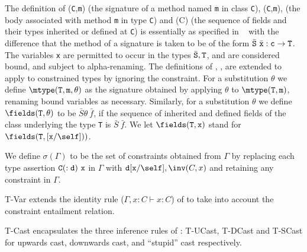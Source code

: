 \def\TConstr{\mbox{\sc T-Constr}}
\def\TInv{\mbox{\sc T-Inv}}
\def\TVar{\mbox{\sc T-Var}}
\def\TField{\mbox{\sc T-Field}}
\def\TInvk{\mbox{\sc T-Invk}}
\def\TNew{\mbox{\sc T-New}}
\def\TCast{\mbox{\sc T-Cast}}
\def\TUCast{\mbox{\sc T-UCast}}
\def\TDCast{\mbox{\sc T-DCast}}
\def\TSCast{\mbox{\sc T-SCast}}

\def\RField{\mbox{\sc R-Field}}
\def\RCField{\mbox{\sc RC-Field}}
\def\RInvk{\mbox{\sc R-Invk}}
\def\RCInvkRecv{\mbox{\sc RC-Invk-Recv}}
\def\RCInvkArg{\mbox{\sc RC-Invk-Arg}}
\def\RCNewArg{\mbox{\sc RC-New-Arg}}
\def\RCast{\mbox{\sc R-Cast}}
\def\RCCast{\mbox{\sc RC-Cast}}

The definition of {\mtype({\tt C},{\tt m})} (the signature of a method
named {\tt m} in class {\tt C}), {\mbody({\tt C},{\tt m})}, (the body
associated with method {\tt m} in type {\tt C}) and \fields(C) (the
sequence of fields and their types inherited or defined at {\tt C}) is
essentially as specified in \FJ{} ~\cite{FJ} with the difference that the
method of a signature is taken to be of the form $\bar{\tt S}\ \bar{\tt
x}: {\tt c} \rightarrow {\tt T}$.  The variables {\tt x} are permitted
to occur in the types $\bar{\tt S},{\tt T}$, and are considered bound,
and subject to alpha-renaming.  The definitions of \mtype, \mbody,
\fields{} are extended to apply to constrained types by ignoring the
constraint.  For a substitution $\theta$ we define $\mtype({\tt
T},{\tt m},\theta)$ as the signature obtained by applying $\theta$ to
$\mtype({\tt T},{\tt m})$, renaming bound variables as necessary.
Similarly, for a substitution $\theta$ we define $\fields({\tt
T},\theta)$ to be $\bar{S}\theta\ \bar{f}$, if the sequence of
inherited and defined fields of the class underlying the type {\tt T}
is $\bar{S}\ \bar{f}$. We let $\fields({\tt T},{\tt x})$ stand for
$\fields({\tt T},[{\tt x}/\self]))$.

We define $\sigma(\Gamma)$ to be the set of
constraints obtained from $\Gamma$ by replacing each type assertion
${\tt C(:d)\ x}$ in $\Gamma$ with ${\tt d}[{\tt x}/\self],\inv(C,x)$
and retaining any constraint in $\Gamma$.

\TVar{} extends the identity rule ($\Gamma, x:C \vdash x:C$) of
\FJ{} to take into account the constraint entailment relation.

\TCast{} encapsulates the three inference rules of \FJ{} :
\TUCast{}, \TDCast{} and \TSCast{} for upwards cast, downwards cast, and ``stupid'' cast respectively. 


